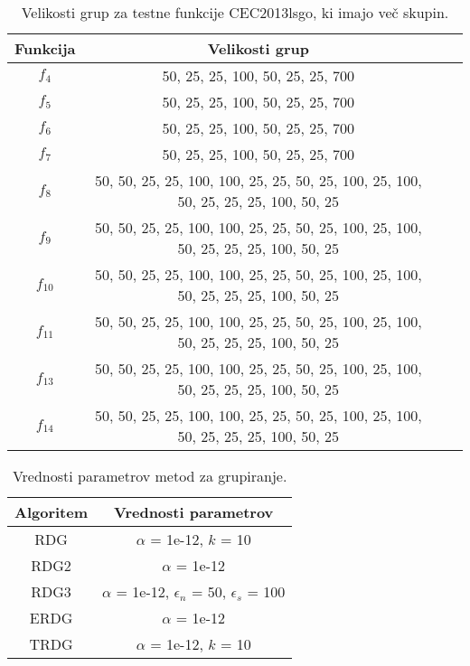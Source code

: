\begin{table}[t]
    \renewcommand{\arraystretch}{1.3}
    \centering
    \caption{Velikosti grup za testne funkcije CEC2013lsgo, ki imajo več skupin.} \label{tab:bech:func_basic_stats_groups_no}
    \begin{tabular}{|c|c|c|c|}
        \hline
        Funkcija & Velikosti grup \\\hline
        $f_4$    & 50, 25, 25, 100, 50, 25, 25, 700 \\\hline
        $f_5$    & 50, 25, 25, 100, 50, 25, 25, 700 \\\hline
        $f_6$    & 50, 25, 25, 100, 50, 25, 25, 700 \\\hline
        $f_7$    & 50, 25, 25, 100, 50, 25, 25, 700 \\\hline
        $f_8$    & 50, 50, 25, 25, 100, 100, 25, 25, 50, 25, 100, 25, 100, 50, 25, 25, 25, 100, 50, 25 \\\hline
        $f_9$    & 50, 50, 25, 25, 100, 100, 25, 25, 50, 25, 100, 25, 100, 50, 25, 25, 25, 100, 50, 25 \\\hline
        $f_{10}$ & 50, 50, 25, 25, 100, 100, 25, 25, 50, 25, 100, 25, 100, 50, 25, 25, 25, 100, 50, 25 \\\hline
        $f_{11}$ & 50, 50, 25, 25, 100, 100, 25, 25, 50, 25, 100, 25, 100, 50, 25, 25, 25, 100, 50, 25 \\\hline
        $f_{13}$ & 50, 50, 25, 25, 100, 100, 25, 25, 50, 25, 100, 25, 100, 50, 25, 25, 25, 100, 50, 25 \\\hline
        $f_{14}$ & 50, 50, 25, 25, 100, 100, 25, 25, 50, 25, 100, 25, 100, 50, 25, 25, 25, 100, 50, 25 \\\hline
    \end{tabular}
\end{table}


\begin{table}[t]
    \renewcommand{\arraystretch}{1.3}
    \centering
    \caption{Vrednosti parametrov metod za grupiranje.} \label{tab:algs:group_params}
    \begin{tabular}{|c|c|}
        \hline
        Algoritem & Vrednosti parametrov \\\hline
        RDG  & $\alpha$ = 1e-12, $k$ = 10 \\\hline
        RDG2 & $\alpha$ = 1e-12 \\\hline
        RDG3 & $\alpha$ = 1e-12, $\epsilon_n$ = 50, $\epsilon_s$ = 100 \\\hline
        ERDG & $\alpha$ = 1e-12 \\\hline
        TRDG & $\alpha$ = 1e-12, $k$ = 10 \\\hline
    \end{tabular}
\end{table}

